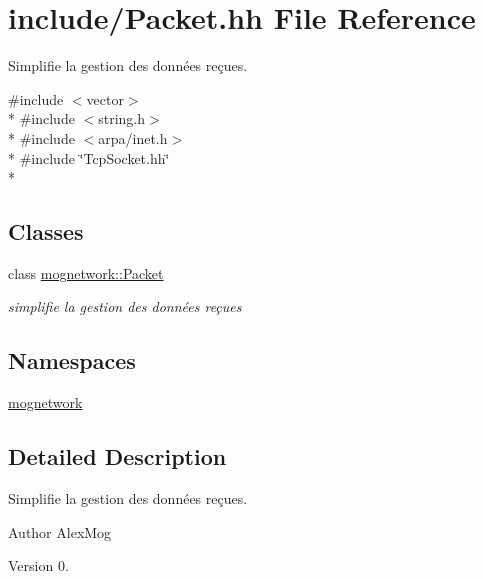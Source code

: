 \hypertarget{_packet_8hh}{\section{include/\-Packet.hh File Reference}
\label{_packet_8hh}
}


Simplifie la gestion des données reçues.  


{\ttfamily \#include $<$vector$>$}\\*
{\ttfamily \#include $<$string.\-h$>$}\\*
{\ttfamily \#include $<$arpa/inet.\-h$>$}\\*
{\ttfamily \#include \char`\"{}Tcp\-Socket.\-hh\char`\"{}}\\*
\subsection*{Classes}
\begin{DoxyCompactItemize}
\item 
class \hyperlink{classmognetwork_1_1_packet}{mognetwork\-::\-Packet}
\begin{DoxyCompactList}\small\item\em simplifie la gestion des données reçues \end{DoxyCompactList}\end{DoxyCompactItemize}
\subsection*{Namespaces}
\begin{DoxyCompactItemize}
\item 
\hyperlink{namespacemognetwork}{mognetwork}
\end{DoxyCompactItemize}


\subsection{Detailed Description}
Simplifie la gestion des données reçues. \begin{DoxyAuthor}{Author}
Alex\-Mog 
\end{DoxyAuthor}
\begin{DoxyVersion}{Version}
0. 
\end{DoxyVersion}
